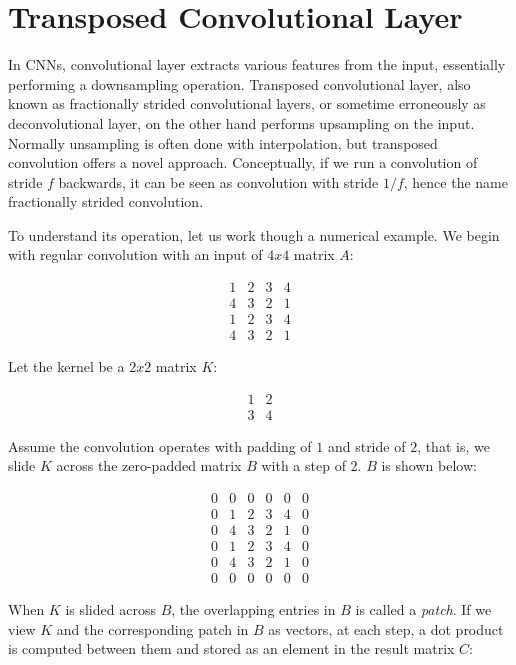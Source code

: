
\chapter{Transposed Convolutional Layer}

In CNNs, convolutional layer extracts various features from the input, essentially performing a downsampling
operation. Transposed convolutional layer, also known as fractionally strided convolutional layers, or sometime
erroneously as deconvolutional layer, on the other hand performs upsampling on the input. Normally unsampling
is often done with interpolation, but transposed convolution offers a novel approach. Conceptually,
if we run a convolution of stride $f$ backwards, it can be seen as convolution with stride $1/f$, hence the
name fractionally strided convolution.

To understand its operation, let us work though a numerical example. We begin with regular convolution
with an input of $4x4$ matrix $A$:

$$
\begin{matrix}
  1 & 2 & 3 & 4 \\
  4 & 3 & 2 & 1 \\
  1 & 2 & 3 & 4 \\
  4 & 3 & 2 & 1
\end{matrix}
$$

Let the kernel be a $2x2$ matrix $K$:

$$
\begin{matrix}
  1 & 2 \\
  3 & 4
\end{matrix}
$$

Assume the convolution operates with padding of $1$ and stride of $2$, that is, we slide $K$ across the
zero-padded matrix $B$ with a step of $2$. $B$ is shown below:

$$
\begin{matrix}
  0 & 0 & 0 & 0 & 0 & 0 \\
  0 & 1 & 2 & 3 & 4 & 0 \\
  0 & 4 & 3 & 2 & 1 & 0 \\
  0 & 1 & 2 & 3 & 4 & 0 \\
  0 & 4 & 3 & 2 & 1 & 0 \\
  0 & 0 & 0 & 0 & 0 & 0
\end{matrix}
$$

When $K$ is slided across $B$, the overlapping entries in $B$ is called a \textit{patch}. If we view $K$ and
the corresponding patch in $B$ as vectors, at each step, a dot product is computed between them and stored as
an element in the result matrix $C$:

